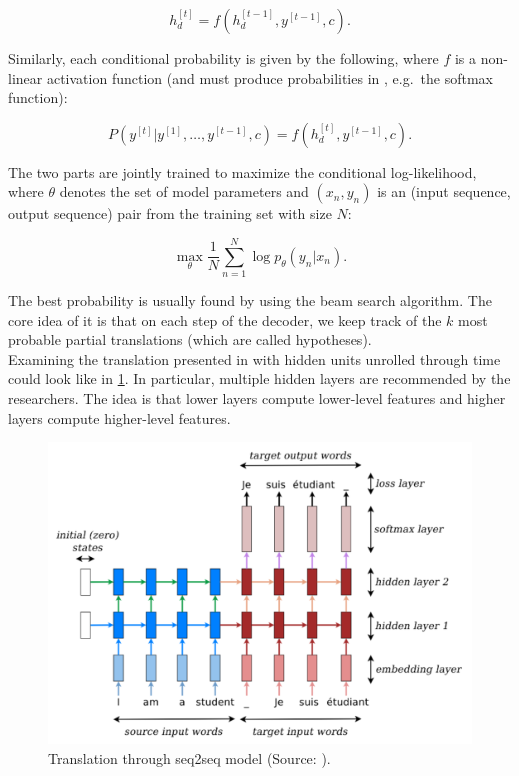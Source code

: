 \documentclass[
]{krantz}
\begin{document}
\[h_d^{[t]} = f(h_d^{[t-1]},y^{[t-1]},c).
    \label{eqn:h_dec}\]

Similarly, each conditional probability is given by the following, where
\(f\) is a non-linear activation function (and must produce probabilities in
, e.g.~the softmax function):

\[P(y^{[t]}|y^{[1]}, \dots ,y^{[t-1]},c) = f(h_d^{[t]}, y^{[t-1]}, c).     \label{eqn:P_dec}\]

The two parts are jointly trained to maximize the conditional
log-likelihood, where \(\theta\) denotes the set of model parameters and
\((x_n, y_n)\) is an (input sequence, output sequence) pair from the
training set with size \(N\):

\[\max_\theta \frac{1}{N} \displaystyle \sum_{n=1}^{N} \log p_{\theta}(y_n|x_n).
    \label{eqn:train_dec}\]

The best probability is usually found by using the beam search
algorithm. The core idea of it is that on each step of the decoder, we
keep track of the \(k\) most probable partial translations (which are
called hypotheses).\\

Examining the translation presented in with hidden units unrolled
through time could look like in \ref{fig:encdecArch2}. In particular, multiple hidden layers
are recommended by the researchers. The idea is that lower layers
compute lower-level features and higher layers compute higher-level
features.

\begin{figure}

{\centering \includegraphics[width=0.7\linewidth]{./figures/01-01-nlp/encdec_arch2_deepl} 

}

\caption{Translation through seq2seq model (Source: \citet{Manning2022}).}\label{fig:encdecArch2}
\end{figure}
\end{document}

